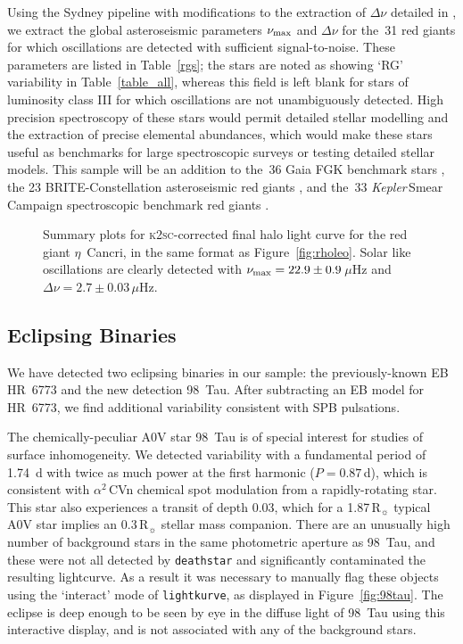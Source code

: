 \documentclass[modern]{aastex62}
\newcommand{\numax}{\mbox{$\nu_{\rm max}$}\xspace}
\newcommand{\Dnu}{\mbox{$\Delta \nu$}\xspace}
\newcommand{\muHz}{\mbox{$\mu$Hz}\xspace}
\newcommand{\rsun}{\mbox{$\mathrm{R}_{\sun}$}\xspace}
\newcommand\kepler{\emph{Kepler}\,}
\begin{document}
Using the Sydney pipeline \citep{Huber2009} with modifications to the extraction of \Dnu detailed in \citet{Yu2018}, we extract the global asteroseismic parameters \numax and \Dnu for the~31 red giants for which oscillations are detected with sufficient signal-to-noise. These parameters are listed in Table~\ref{rgs}; the stars are noted as showing `RG' variability in Table~\ref{table_all}, whereas this field is left blank for stars of luminosity class III for which oscillations are not unambiguously detected. High precision spectroscopy of these stars would permit detailed stellar modelling and the extraction of precise elemental abundances, which would make these stars useful as benchmarks for large spectroscopic surveys or testing detailed stellar models. This sample will be an addition to the~36 Gaia FGK benchmark stars \citep{gaiabenchmark1,gaiabenchmark3,2018RNAAS...2c.152J}, the 23 BRITE-Constellation asteroseismic red giants \citep{Kallinger2019}, and the~33 \kepler Smear Campaign spectroscopic benchmark red giants \citep{smearcampaign}. 

\begin{figure*}
\caption{Summary plots for \textsc{k2sc}-corrected final halo light curve for the red giant $\eta$~Cancri, in the same format as Figure~\ref{fig:rholeo}. Solar like oscillations are clearly detected with $\numax = 22.9 \pm 0.9$\,\muHz and $\Dnu = 2.7 \pm 0.03$\,\muHz.}
\label{fig:etacnc}
\end{figure*}


\subsection{Eclipsing Binaries}
\label{sec:ebs}

We have detected two eclipsing binaries in our sample: the previously-known EB HR~6773 and the new detection 98~Tau. After subtracting an EB model for HR~6773, we find additional variability consistent with SPB pulsations. 

The chemically-peculiar A0V star 98~Tau is of special interest for studies of surface inhomogeneity. We detected variability with a fundamental period of 1.74~d with twice as much power at the first harmonic ($P = 0.87$\,d), which is consistent with $\alpha^2$\,CVn chemical spot modulation from a rapidly-rotating star. This star also experiences a transit of depth 0.03, which for a 1.87\,\rsun typical A0V star implies an 0.3\,\rsun stellar mass companion. There are an unusually high number of background stars in the same photometric aperture as 98~Tau, and these were not all detected by \texttt{deathstar} and significantly contaminated the resulting lightcurve. As a result it was necessary to manually flag these objects using the `interact' mode of \texttt{lightkurve}, as displayed in Figure~\ref{fig:98tau}. The eclipse is deep enough to be seen by eye in the diffuse light of 98~Tau using this interactive display, and is not associated with any of the background stars.
\end{document}
